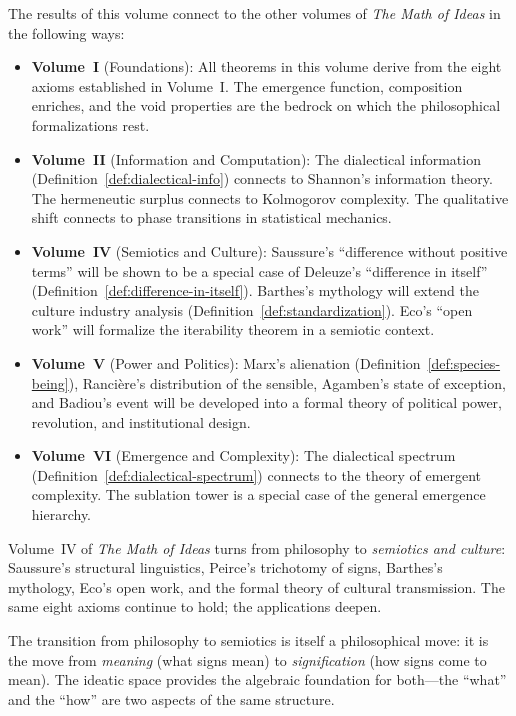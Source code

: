 \begin{remark}
The results of this volume connect to the other volumes of \emph{The Math
of Ideas} in the following ways:
\begin{itemize}
\item \textbf{Volume~I} (Foundations): All theorems in this volume derive
from the eight axioms established in Volume~I. The emergence function,
composition enriches, and the void properties are the bedrock on which
the philosophical formalizations rest.

\item \textbf{Volume~II} (Information and Computation): The dialectical
information (Definition~\ref{def:dialectical-info}) connects to Shannon's
information theory. The hermeneutic surplus connects to Kolmogorov
complexity. The qualitative shift connects to phase transitions in
statistical mechanics.

\item \textbf{Volume~IV} (Semiotics and Culture): Saussure's ``difference
without positive terms'' will be shown to be a special case of Deleuze's
``difference in itself'' (Definition~\ref{def:difference-in-itself}).
Barthes's mythology will extend the culture industry analysis
(Definition~\ref{def:standardization}). Eco's ``open work'' will
formalize the iterability theorem in a semiotic context.

\item \textbf{Volume~V} (Power and Politics): Marx's alienation
(Definition~\ref{def:species-being}), Rancière's distribution of the
sensible, Agamben's state of exception, and Badiou's event will be
developed into a formal theory of political power, revolution, and
institutional design.

\item \textbf{Volume~VI} (Emergence and Complexity): The dialectical
spectrum (Definition~\ref{def:dialectical-spectrum}) connects to the
theory of emergent complexity. The sublation tower is a special case of
the general emergence hierarchy.
\end{itemize}
\end{remark}

\begin{remark}
Volume~IV of \emph{The Math of Ideas} turns from philosophy to \emph{semiotics
and culture}: Saussure's structural linguistics, Peirce's trichotomy of signs,
Barthes's mythology, Eco's open work, and the formal theory of cultural
transmission. The same eight axioms continue to hold; the applications deepen.

The transition from philosophy to semiotics is itself a philosophical move:
it is the move from \emph{meaning} (what signs mean) to \emph{signification}
(how signs come to mean). The ideatic space provides the algebraic foundation
for both---the ``what'' and the ``how'' are two aspects of the same structure.
\end{remark}
